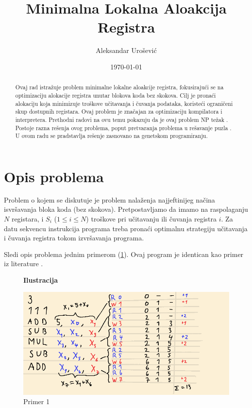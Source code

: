 \documentclass[a4paper, 12pt]{article}
\begin{document}
\title{Minimalna Lokalna Aloakcija Registra}
\author{Aleksandar Urošević}
\date{\today}
\maketitle

\begin{abstract}
Ovaj rad istražuje problem minimalne lokalne aloakcije registra, fokusirajući se na optimizaciju alokacije registra unutar blokova koda bez skokova. Cilj je pronaći alokaciju koja minimizuje troškove učitavanja i čuvanja podataka, koristeći ograničeni skup dostupnih registara. Ovaj problem je značajan za optimizaciju kompilatora i interpretera. Prethodni radovi na ovu temu pokazuju da je ovaj problem NP težak \cite{OnLocalRegisterAllocation}. Postoje razna rešenja ovog problema, poput pretvaranja problema u rešavanje puzla \cite{RegisterAllocationByPuzzleSolving}. U ovom radu se pradstavlja rešenje zasnovano na genetskom programiranju.
\end{abstract}

\section{Opis problema}
Problem o kojem se diskutuje je problem nalaženja najjeftinijeg načina isvršavanja bloka koda (bez skokova). Pretpostavljamo da imamo na raspolaganju $N$ registara, i $S_i$ ($1 \leq i \leq N$) troškove pri učitavanju ili čuvanja registra $i$. Za datu sekvencu instrukcija programa treba pronaći optimalnu strategiju učitavanja i čuvanja registra tokom izvršavanja programa. 

Sledi opis problema jednim primerom (\ref{primer1}). Ovaj program je identican kao primer iz literature \cite{EvaluationOfAlgorithmsForLocalRegisterAllocation}.

\begin{figure}
\centering
\textbf{Ilustracija}\par\medskip
\includegraphics[scale=0.45]{Image/Illustration1}
\caption{Primer 1}
\label{primer1}
\end{figure}
\end{document}
